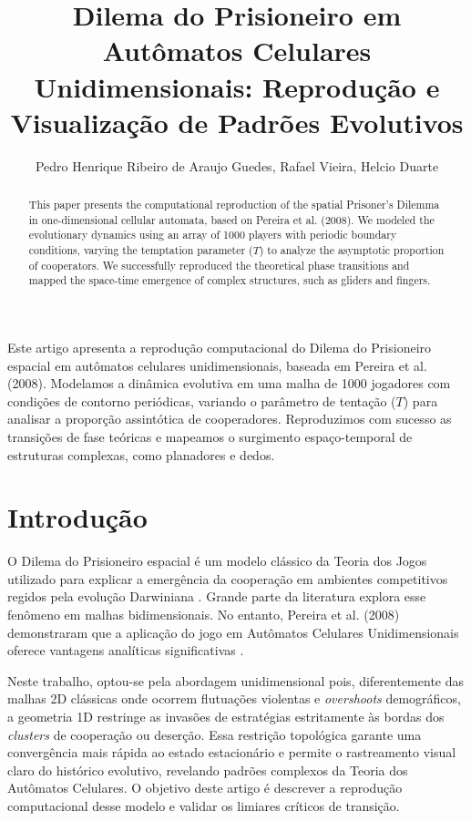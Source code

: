 \documentclass[12pt]{article}
\title{Dilema do Prisioneiro em Autômatos Celulares Unidimensionais: Reprodução e Visualização de Padrões Evolutivos}
\author{Pedro Henrique Ribeiro de Araujo Guedes\inst{1}, Rafael Vieira\inst{1}, Helcio Duarte\inst{1}}
\begin{document}
 

\maketitle

\begin{abstract}
  This paper presents the computational reproduction of the spatial Prisoner's Dilemma in one-dimensional cellular automata, based on Pereira et al. (2008). We modeled the evolutionary dynamics using an array of 1000 players with periodic boundary conditions, varying the temptation parameter ($T$) to analyze the asymptotic proportion of cooperators. We successfully reproduced the theoretical phase transitions and mapped the space-time emergence of complex structures, such as gliders and fingers.
\end{abstract}
     
\begin{resumo} 
  Este artigo apresenta a reprodução computacional do Dilema do Prisioneiro espacial em autômatos celulares unidimensionais, baseada em Pereira et al. (2008). Modelamos a dinâmica evolutiva em uma malha de 1000 jogadores com condições de contorno periódicas, variando o parâmetro de tentação ($T$) para analisar a proporção assintótica de cooperadores. Reproduzimos com sucesso as transições de fase teóricas e mapeamos o surgimento espaço-temporal de estruturas complexas, como planadores e dedos.
\end{resumo}

\section{Introdução}

O Dilema do Prisioneiro espacial é um modelo clássico da Teoria dos Jogos utilizado para explicar a emergência da cooperação em ambientes competitivos regidos pela evolução Darwiniana \cite{nowak1992}. Grande parte da literatura explora esse fenômeno em malhas bidimensionais. No entanto, Pereira et al. (2008) demonstraram que a aplicação do jogo em Autômatos Celulares Unidimensionais oferece vantagens analíticas significativas \cite{pereira2008}.

Neste trabalho, optou-se pela abordagem unidimensional pois, diferentemente das malhas 2D clássicas onde ocorrem flutuações violentas e \textit{overshoots} demográficos, a geometria 1D restringe as invasões de estratégias estritamente às bordas dos \textit{clusters} de cooperação ou deserção. Essa restrição topológica garante uma convergência mais rápida ao estado estacionário e permite o rastreamento visual claro do histórico evolutivo, revelando padrões complexos da Teoria dos Autômatos Celulares. O objetivo deste artigo é descrever a reprodução computacional desse modelo e validar os limiares críticos de transição.
\end{document}
